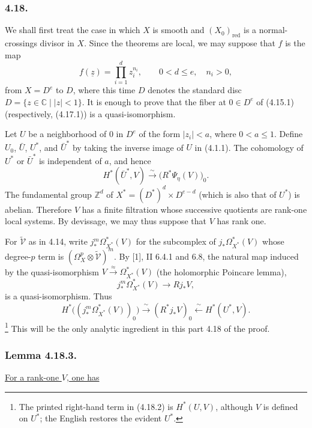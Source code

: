 \subsubsection*{4.18.}
We shall first treat the case in which $X$ is smooth and
$(X_0)_{\mathrm{red}}$ is a normal-crossings divisor in $X$.  Since
the theorems are local, we may suppose that $f$ is the map
\[
f(\underline z)=\prod_{i=1}^d z_i^{n_i},
\qquad 0<d\leq e,\quad n_i>0,
\]
from $X=D^e$ to $D$, where this time $D$ denotes the standard disc
$D=\{z\in\mathbb C\mid |z|<1\}$.  It is enough to prove that the
fiber at $0\in D^e$ of (4.15.1) (respectively, (4.17.1)) is a
quasi-isomorphism.

Let $U$ be a neighborhood of $0$ in $D^e$ of the form
$|z_i|<a$, where $0<a\leq1$.  Define $U_0$, $\bar U$, $U^*$, and
$\bar U^*$ by taking the inverse image of $U$ in (4.1.1).  The
cohomology of $U^*$ or $\bar U^*$ is independent of $a$, and hence
\[
H^*(\bar U^*,V)\xrightarrow{\ \sim\ }
  \bigl(R^*\Psi_\eta(V)\bigr)_0.
\]
The fundamental group $\mathbb Z^d$ of
$X^*=(D^*)^d\times D^{e-d}$ (which is also that of $U^*$) is
abelian.  Therefore $V$ has a finite filtration whose successive
quotients are rank-one local systems.  By devissage, we may thus
suppose that $V$ has rank one.

For $\widetilde{\mathcal V}$ as in 4.14, write
$j_*^m\Omega_{X^*}^*(V)$ for the subcomplex of
$j_*\Omega_{X^*}^*(V)$ whose degree-$p$ term is
$(\Omega_X^p\otimes\widetilde{\mathcal V})^m$.  By [1], II 6.4.1
and 6.8, the natural map induced by the quasi-isomorphism
$V\xrightarrow{\ \approx\ }\Omega_{X^*}^*(V)$ (the holomorphic
Poincare lemma),
\begin{equation}\tag{4.18.1}
j_*^m\Omega_{X^*}^*(V)\longrightarrow Rj_*V,
\end{equation}
is a quasi-isomorphism.  Thus
\begin{equation}\tag{4.18.2}
H^*\bigl((j_*^m\Omega_{X^*}^*(V))_0\bigr)
 \xrightarrow{\ \sim\ }(R^*j_*V)_0
 \xleftarrow{\ \sim\ }H^*(U^*,V).
\end{equation}
\footnote{The printed right-hand term in (4.18.2) is $H^*(U,V)$,
although $V$ is defined on $U^*$; the English restores the evident
$U^*$.}
This will be the only analytic ingredient in this part 4.18 of the
proof.

\subsubsection*{Lemma 4.18.3.}
\underline{For a rank-one $V$, one has}

